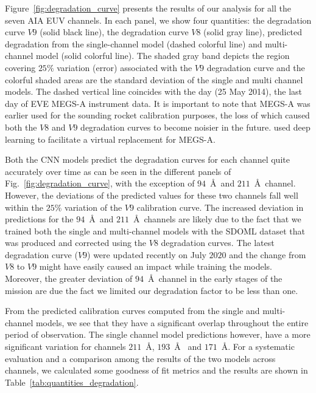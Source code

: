 \documentclass{aa}
\begin{document}
Figure~\ref{fig:degradation_curve} presents the results of our analysis for all the seven AIA EUV channels. In each panel, we show four quantities: the degradation curve $V9$ (solid black line), the degradation curve $V8$ (solid gray line), predicted degradation from the single-channel model (dashed colorful line) and multi-channel model (solid colorful line). The shaded gray band depicts the region covering $25\%$ variation (error) associated with the $V9$ degradation curve and the colorful shaded areas are the standard deviation of the single and multi channel models. The dashed vertical line coincides with the day (25 May 2014), the last day of EVE MEGS-A instrument data. It is important to note that MEGS-A was earlier used for the sounding rocket calibration purposes, the loss of which caused both the $V8$ and $V9$ degradation curves to become noisier in the future. \citet{Szenicereaaw6548} used deep learning to facilitate a virtual replacement for MEGS-A.

Both the CNN models predict the degradation curves for each channel quite accurately over time as can be seen in the different panels of Fig.~\ref{fig:degradation_curve}, with the exception of $94$~\AA\ and $211$~\AA\ channel. However, the deviations of the predicted values for these two channels fall well within the $25\%$ variation of the $V9$  calibration curve.
The increased deviation in predictions for the $94$~\AA\ and $211$~\AA\ channels are likely due to the fact that we trained both the single and multi-channel models with the SDOML dataset that was produced and corrected using the $V8$ degradation curves. The latest degradation curve ($V9$) were updated recently on July $2020$ and the change from $V8$ to $V9$ might have easily caused an impact while training the models. Moreover, the greater deviation of $94$~\AA\ channel in the early stages of the mission are due the fact we limited our degradation factor to be less than one. 

From the predicted calibration curves computed from the single and multi-channel models, we see that they have a significant overlap throughout the entire period of observation. The single channel model predictions however, have a more significant variation for channels $211$~\AA, $193$~\AA~ and $171$~\AA. For a systematic evaluation and a comparison among the results of the two models across channels, we calculated some goodness of fit metrics and the results are shown in Table~\ref{tab:quantities_degradation}.
\end{document}
